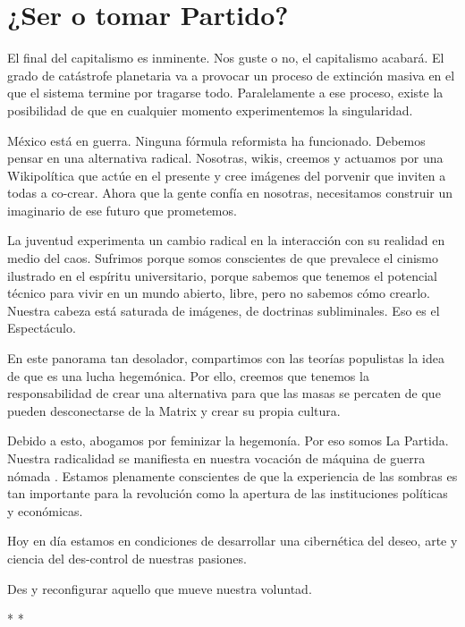 \hypertarget{ser-o-tomar-partido}{%
\section{¿Ser o tomar Partido?}\label{ser-o-tomar-partido}}

El final del capitalismo es inminente. Nos guste o no, el capitalismo
acabará. El grado de catástrofe planetaria va a provocar un proceso de
extinción masiva en el que el sistema termine por tragarse todo.
Paralelamente a ese proceso, existe la posibilidad de que en cualquier
momento experimentemos la singularidad.

México está en guerra. Ninguna fórmula reformista ha funcionado. Debemos
pensar en una alternativa radical. Nosotras, wikis, creemos y actuamos
por una Wikipolítica que actúe en el presente y cree imágenes del
porvenir que inviten a todas a co-crear. Ahora que la gente confía en
nosotras, necesitamos construir un imaginario de ese futuro que
prometemos.

La juventud experimenta un cambio radical en la interacción con su
realidad en medio del caos. Sufrimos porque somos conscientes de que
prevalece el cinismo ilustrado en el espíritu universitario, porque
sabemos que tenemos el potencial técnico para vivir en un mundo abierto,
libre, pero no sabemos cómo crearlo. Nuestra cabeza está saturada de
imágenes, de doctrinas subliminales. Eso es el Espectáculo.

En este panorama tan desolador, compartimos con las teorías populistas
la idea de que es una lucha hegemónica. Por ello, creemos que tenemos la
responsabilidad de crear una alternativa para que las masas se percaten
de que pueden desconectarse de la Matrix y crear su propia cultura.

Debido a esto, abogamos por feminizar la hegemonía. Por eso somos La
Partida. Nuestra radicalidad se manifiesta en nuestra vocación de
máquina de guerra nómada \cite{Negri2013}. Estamos
plenamente conscientes de que la experiencia de las sombras es tan
importante para la revolución como la apertura de las instituciones
políticas y económicas.

Hoy en día estamos en condiciones de desarrollar una cibernética del
deseo, arte y ciencia del des-control de nuestras pasiones.

Des y reconfigurar aquello que mueve nuestra voluntad.

\begin{center}
    * *
\end{center}


